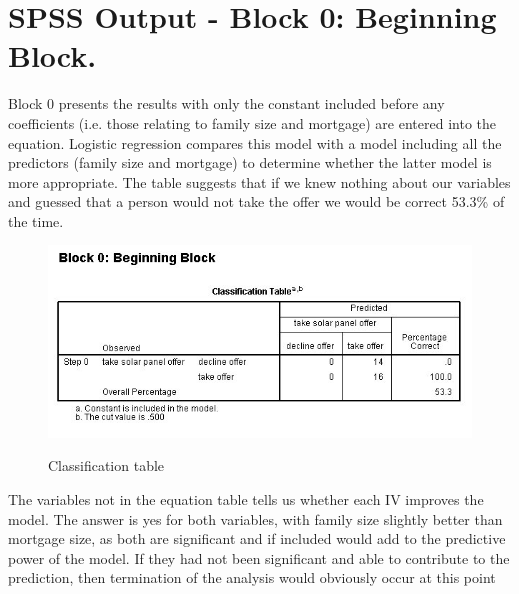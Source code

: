 \documentclass[a4paper,12pt]{article}
\begin{document}
\section{SPSS Output  - Block 0: Beginning Block.}
Block 0 presents the results with only the constant included
before any coefficients (i.e. those relating to family size and mortgage) are entered into
the equation. Logistic regression compares this model with a model including all the
predictors (family size and mortgage) to determine whether the latter model is more
appropriate. The table suggests that if we knew nothing about our variables and guessed
that a person would not take the offer we would be correct 53.3\% of the time.
\begin{figure}[h!]
\begin{center}
  \includegraphics[scale=0.6]{images/Logistic3.jpg}\\
  \caption{Classification table}
\end{center}
\end{figure}
The variables not in the equation table tells us whether each IV improves the model. The answer is yes for both variables, with family size slightly better than mortgage size, as both are significant and if included would add to the predictive power of the model. If they had not been significant and able to contribute to the prediction,
then termination of the analysis would obviously occur at this point
\end{document}
